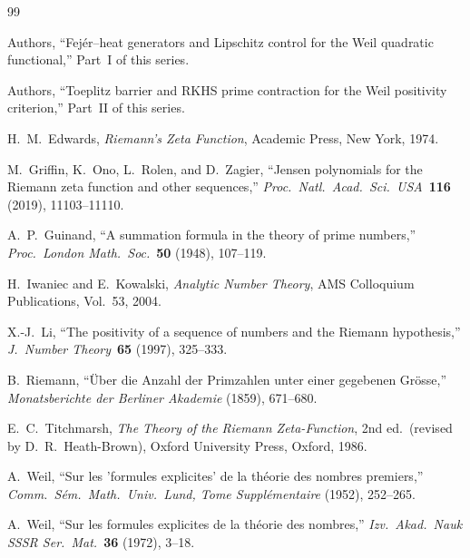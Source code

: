 \documentclass[11pt,a4paper]{article}
\theoremstyle{definition}
\theoremstyle{remark}
\begin{document}
\begin{thebibliography}{99}

Authors,
``Fej\'er--heat generators and Lipschitz control for the Weil quadratic functional,''
Part~I of this series.

Authors,
``Toeplitz barrier and RKHS prime contraction for the Weil positivity criterion,''
Part~II of this series.

H.~M.~Edwards,
\emph{Riemann's Zeta Function},
Academic Press, New York, 1974.

M.~Griffin, K.~Ono, L.~Rolen, and D.~Zagier,
``Jensen polynomials for the Riemann zeta function and other sequences,''
\emph{Proc.\ Natl.\ Acad.\ Sci.\ USA}\ \textbf{116} (2019), 11103--11110.

A.~P.~Guinand,
``A summation formula in the theory of prime numbers,''
\emph{Proc.\ London Math.\ Soc.}\ \textbf{50} (1948), 107--119.

H.~Iwaniec and E.~Kowalski,
\emph{Analytic Number Theory},
AMS Colloquium Publications, Vol.~53, 2004.

X.-J.~Li,
``The positivity of a sequence of numbers and the Riemann hypothesis,''
\emph{J.\ Number Theory}\ \textbf{65} (1997), 325--333.

B.~Riemann,
``\"Uber die Anzahl der Primzahlen unter einer gegebenen Gr\"osse,''
\emph{Monatsberichte der Berliner Akademie} (1859), 671--680.

E.~C.~Titchmarsh,
\emph{The Theory of the Riemann Zeta-Function},
2nd ed.\ (revised by D.~R.~Heath-Brown), Oxford University Press, Oxford, 1986.

A.~Weil,
``Sur les 'formules explicites' de la th\'eorie des nombres premiers,''
\emph{Comm.\ S\'em.\ Math.\ Univ.\ Lund, Tome Suppl\'ementaire} (1952), 252--265.

A.~Weil,
``Sur les formules explicites de la th\'eorie des nombres,''
\emph{Izv.\ Akad.\ Nauk SSSR Ser.\ Mat.}\ \textbf{36} (1972), 3--18.

\end{thebibliography}
\end{document}

